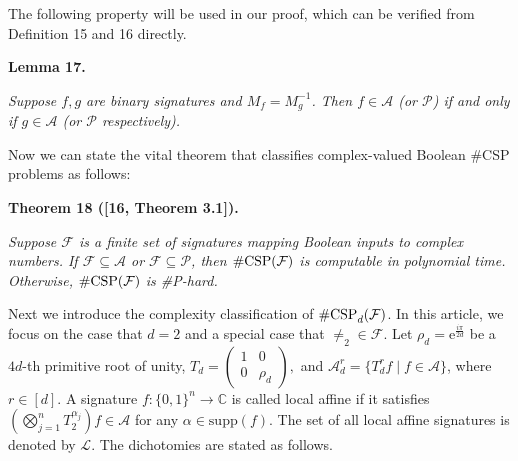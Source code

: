 


The following property will be used in our proof, which can be verified from Definition 15
and 16 directly.\par





\par\medskip\noindent\textbf{
\textbf{Lemma 17}\textbf{.}
}\par



\emph{Suppose $f,g$ are binary signatures and $M_{f}=M_{g}^{-1}$. Then $f\in\mathscr{A}$ (or $\mathscr{P}$) if and only if $g\in\mathscr{A}$ (or $\mathscr{P}$ respectively).}\par






Now we can state the vital theorem that classifies complex-valued Boolean \#CSP problems as follows:\par





\par\medskip\noindent\textbf{
\textbf{Theorem 18}\textbf{ }([16, Theorem 3.1])\textbf{.}
}\par



\emph{Suppose $\mathcal{F}$ is a finite set of signatures mapping Boolean inputs to complex numbers. If $\mathcal{F}\subseteq\mathscr{A}$ or $\mathcal{F}\subseteq\mathscr{P}$, then $\#\textup{{CSP}}(\mathcal{F})$ is computable in polynomial time. Otherwise, $\#\textup{{CSP}}(\mathcal{F})$ is \#P-hard.}\par






Next we introduce the complexity classification of $\textup{{\#CSP}}_{d}(\mathcal{F})$. In this article, we focus on the case that $d=2$ and a special case that $\neq_{2}\in\mathcal{F}$. Let $\rho_{d}=\text{e}^{\frac{i\pi}{2d}}$ be a $4d$-th primitive root of unity, $T_{d}=\begin{pmatrix}1&0\\
0&\rho_{d}\end{pmatrix},$ and $\mathscr{A}_{d}^{r}=\{T_{d}^{r}f\mid f\in\mathscr{A}\}$, where $r\in[d]$.
A signature $f:\{0,1\}^{n}\rightarrow\mathbb{C}$ is called local affine if it satisfies $(\bigotimes_{j=1}^{n}T_{2}^{\alpha_{j}})f\in\mathscr{A}$ for any $\alpha\in\text{supp}(f)$. The set of all local affine signatures is denoted by $\mathscr{L}$. The dichotomies are stated as follows.\par




